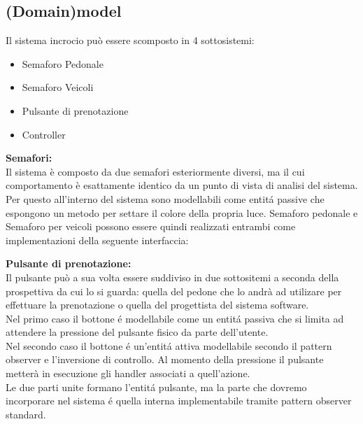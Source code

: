 \documentclass{llncs}
\begin{document}
\subsection{(Domain)model}
Il sistema incrocio può essere scomposto in 4 sottosistemi:
\begin{itemize}
	\item Semaforo Pedonale
	\item Semaforo Veicoli
	\item Pulsante di prenotazione
	\item Controller
\end{itemize}

\textbf{Semafori:}\\
Il sistema è composto da due semafori esteriormente diversi, ma il cui comportamento è esattamente identico da un punto di vista di analisi del sistema.\\
Per questo all'interno del sistema sono modellabili come entit\'a passive che espongono un metodo per settare il colore della propria luce. Semaforo pedonale e Semaforo per veicoli possono essere quindi realizzati entrambi come implementazioni della seguente interfaccia:



\textbf{Pulsante di prenotazione:}\\
Il pulsante può a sua volta essere suddiviso in due sottositemi a seconda della prospettiva da cui lo si guarda: quella del pedone che lo andrà ad utilizare per effettuare la prenotazione o quella del progettista del sistema software.\\
Nel primo caso il bottone \'e modellabile come un entit\'a passiva che si limita ad attendere la pressione del pulsante fisico da parte dell'utente. \\
Nel secondo caso il bottone \'e un'entit\'a attiva modellabile secondo il pattern observer e l'inversione di controllo. Al momento della pressione il pulsante metterà in esecuzione gli handler associati a quell'azione.\\
Le due parti unite formano l'entit\'a pulsante, ma la parte che dovremo incorporare nel sistema \'e quella interna implementabile tramite pattern observer standard.\\
\end{document}
